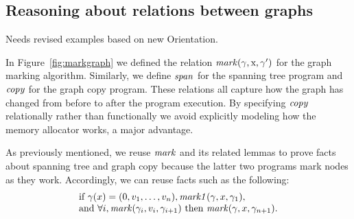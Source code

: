 
\subsection{Reasoning about relations between graphs} %

{\color{blue}Needs revised examples based on new Orientation.}

In Figure~\ref{fig:markgraph} we defined the relation $\mathit{mark}(\gamma, \text{x}, \gamma')$
for the graph marking algorithm.  Similarly, we define $\mathit{span}$ for the spanning tree program
and $\mathit{copy}$ for the graph copy program.
These relations all capture how the graph has changed from before to after the program
execution.  By specifying $\mathit{copy}$ relationally
rather than functionally we avoid explicitly modeling how the memory allocator works, a major advantage.

As previously mentioned, we reuse $\mathit{mark}$ and its
related lemmas to prove facts about spanning tree and graph copy
because the latter two programs mark nodes as they work.
Accordingly, we can reuse facts such as the following:
\[
\begin{array}{@{}l@{}}
\text{if } \gamma(x)=(0, v_1, \dots,v_n), \m{mark1}(\gamma, x, \gamma_1), \\
\text{and } \forall i, \m{mark}(\gamma_i,v_i,\gamma_{i+1}) \text{ then } \m{mark}(\gamma,x,\gamma_{n+1}).
\end{array}
\]


